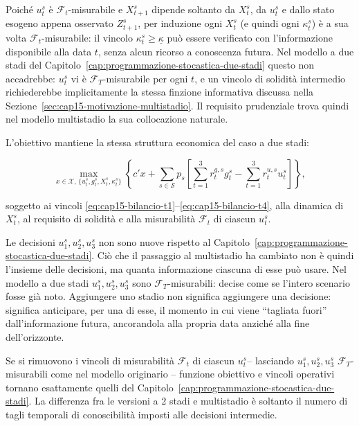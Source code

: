 \begin{remark}

Poich\'e $u_t^s$ \`e $\mathcal F_t$-misurabile e $X_{t+1}^s$ dipende soltanto
da $X_t^s$, da $u_t^s$ e dallo stato esogeno appena osservato $Z_{t+1}^s$,
per induzione ogni $X_t^s$ (e quindi ogni $\kappa_t^s$) \`e a sua volta
$\mathcal F_t$-misurabile: il vincolo $\kappa_t^s\geq\underline\kappa$ pu\`o
essere verificato con l'informazione disponibile alla data $t$, senza alcun
ricorso a conoscenza futura. Nel modello a due stadi del
Capitolo~\ref{cap:programmazione-stocastica-due-stadi} questo non
accadrebbe: $u_t^s$ vi \`e $\mathcal F_T$-misurabile per ogni $t$, e un
vincolo di solidit\`a intermedio richiederebbe implicitamente la stessa
finzione informativa discussa nella
Sezione~\ref{sec:cap15-motivazione-multistadio}. Il requisito prudenziale
trova quindi nel modello multistadio la sua collocazione naturale.

\end{remark}

L'obiettivo mantiene la stessa struttura economica del caso a due stadi:

\[
\max_{x\in\mathcal X,\,\{u_t^s,g_t^s,X_t^s,\kappa_t^s\}}
\left\{
c'x
+
\sum_{s\in\mathcal S}p_s
\left[
\sum_{t=1}^{3}r_t^{g,s}g_t^s-\sum_{t=1}^{3}r_t^{u,s}u_t^s
\right]
\right\},
\]

soggetto ai vincoli
\eqref{eq:cap15-bilancio-t1}--\eqref{eq:cap15-bilancio-t4}, alla dinamica di
$X_t^s$, al requisito di solidit\`a e alla misurabilit\`a $\mathcal
F_t$ di ciascun $u_t^s$.

\begin{remark}

Le decisioni $u_1^s,u_2^s,u_3^s$ non sono nuove rispetto al
Capitolo~\ref{cap:programmazione-stocastica-due-stadi}. Ci\`o che il passaggio al multistadio ha cambiato non \`e quindi
l'insieme delle decisioni, ma quanta informazione ciascuna di esse pu\`o usare. 
Nel modello a due stadi $u_1^s,u_2^s,u_3^s$ sono $\mathcal F_T$-misurabili: decise come se l'intero scenario fosse gi\`a noto. Aggiungere uno stadio non significa aggiungere una decisione: significa anticipare, per una di esse,
il momento in cui viene ``tagliata fuori'' dall'informazione futura, ancorandola alla propria data anzich\'e alla fine dell'orizzonte.

Se si rimuovono i vincoli  di misurabilit\`a $\mathcal
F_t$ di ciascun $u_t^s$-- lasciando $u_1^s,u_2^s,u_3^s$
$\mathcal F_T$-misurabili come nel modello originario -- funzione obiettivo
e vincoli operativi tornano esattamente quelli del
Capitolo~\ref{cap:programmazione-stocastica-due-stadi}. La differenza fra le versioni a 2 stadi e multistadio
\`e soltanto il numero di tagli temporali di
conoscibilit\`a imposti alle decisioni intermedie.
\end{remark}

